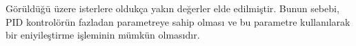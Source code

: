 
Görüldüğü üzere isterlere oldukça yakın değerler elde edilmiştir. Bunun sebebi, PID kontrolörün fazladan parametreye sahip olması ve bu parametre kullanılarak bir eniyileştirme işleminin mümkün olmasıdır.
